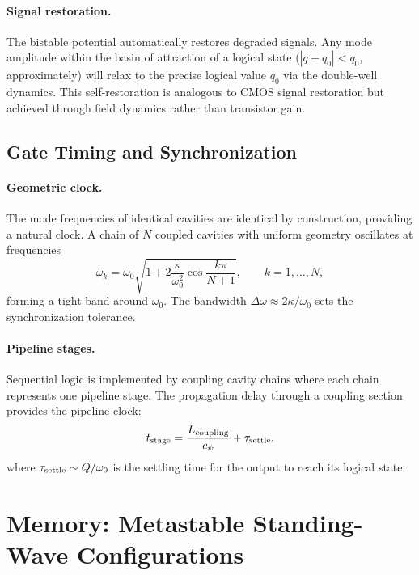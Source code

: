 \documentclass[12pt,a4paper,twoside]{article}
\begin{document}
\paragraph{Signal restoration.} The bistable potential automatically restores degraded signals. Any mode amplitude within the basin of attraction of a logical state ($|q - q_0| < q_0$, approximately) will relax to the precise logical value $q_0$ via the double-well dynamics. This self-restoration is analogous to CMOS signal restoration but achieved through field dynamics rather than transistor gain.

\subsection{Gate Timing and Synchronization}\label{sec:timing}

\paragraph{Geometric clock.} The mode frequencies of identical cavities are identical by construction, providing a natural clock. A chain of $N$ coupled cavities with uniform geometry oscillates at frequencies
\begin{equation}
\omega_k = \omega_0\sqrt{1 + 2\frac{\kappa}{\omega_0^2}\cos\frac{k\pi}{N+1}}, \qquad k = 1, \ldots, N,
\end{equation}
forming a tight band around $\omega_0$. The bandwidth $\Delta\omega \approx 2\kappa/\omega_0$ sets the synchronization tolerance.

\paragraph{Pipeline stages.} Sequential logic is implemented by coupling cavity chains where each chain represents one pipeline stage. The propagation delay through a coupling section provides the pipeline clock:
\begin{equation}
t_{\rm stage} = \frac{L_{\rm coupling}}{c_\psi} + \tau_{\rm settle},
\end{equation}
where $\tau_{\rm settle} \sim Q/\omega_0$ is the settling time for the output to reach its logical state.

\section{Memory: Metastable Standing-Wave Configurations}\label{sec:memory}
\end{document}
